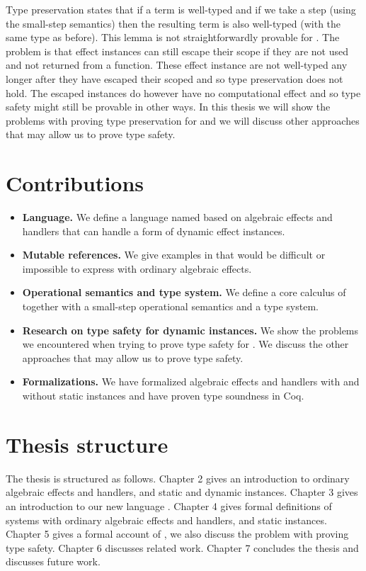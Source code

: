 Type preservation states that if a term is well-typed and if we take a step (using the small-step semantics) then the resulting term is also well-typed (with the same type as before).
This lemma is not straightforwardly provable for \lang{}.
The problem is that effect instances can still escape their scope if they are not used and not returned from a function.
These effect instance are not well-typed any longer after they have escaped their scoped and so type preservation does not hold.
The escaped instances do however have no computational effect and so type safety might still be provable in other ways.
In this thesis we will show the problems with proving type preservation for \lang{} and we will discuss other approaches that may allow us to prove type safety.

\section*{Contributions}
\begin{itemize}

\item \textbf{Language.}
We define a language named \lang{} based on algebraic effects and handlers that can handle a form of dynamic effect instances.

\item \textbf{Mutable references.}
We give examples in \lang{} that would be difficult or impossible to express with ordinary algebraic effects.

\item \textbf{Operational semantics and type system.}
We define a core calculus of \lang{} together with a small-step operational semantics and a type system.

\item \textbf{Research on type safety for dynamic instances.}
We show the problems we encountered when trying to prove type safety for \lang{}.
We discuss the other approaches that may allow us to prove type safety.

\item \textbf{Formalizations.}
We have formalized algebraic effects and handlers with and without static instances and have proven type soundness in Coq.

\end{itemize}

\section*{Thesis structure}
The thesis is structured as follows.
Chapter 2 gives an introduction to ordinary algebraic effects and handlers, and static and dynamic instances.
Chapter 3 gives an introduction to our new language \lang{}.
Chapter 4 gives formal definitions of systems with ordinary algebraic effects and handlers, and static instances.
Chapter 5 gives a formal account of \lang{}, we also discuss the problem with proving type safety.
Chapter 6 discusses related work.
Chapter 7 concludes the thesis and discusses future work.
